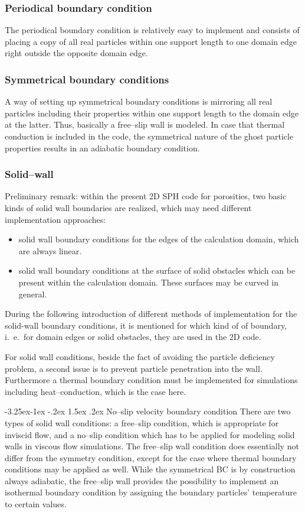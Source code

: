 \documentclass{report}
\makeatletter
\renewcommand\paragraph{\@startsection{paragraph}{4}{\z@}%
  {-3.25ex\@plus -1ex \@minus -.2ex}%
  {1.5ex \@plus .2ex}%
  {\normalfont\normalsize\bfseries}}
\makeatother
\begin{document}
\subsubsection{Periodical boundary condition}
The periodical boundary condition is relatively easy to implement and consists of placing a copy of all real particles within one support length to one domain edge right outside the opposite domain edge.


\subsubsection{Symmetrical boundary conditions}
A way of setting up symmetrical boundary conditions is mirroring all real particles including their properties within one support length to the domain edge at the latter. Thus, basically a free--slip wall is modeled. In case that thermal conduction is included in the code, the symmetrical nature of the ghost particle properties results in an adiabatic boundary condition.

\subsubsection{Solid--wall}
\label{sec:boundaryCond_solidWall}
Preliminary remark: within the present 2D SPH code for porosities, two basic kinds of solid wall boundaries are realized, which may need different implementation approaches:
\begin{itemize}
 \item solid wall boundary conditions for the edges of the calculation domain, which are always linear.
\item solid wall boundary conditions at the surface of solid obstacles which can be present within the calculation domain. These surfaces may be curved in general. 
\end{itemize}
During the following introduction of different methods of implementation for the solid-wall boundary conditions, it is mentioned for which kind of of boundary, i.\ e.\ for domain edges or solid obstacles, they are used in the 2D code. 

For solid wall conditions, beside the fact of avoiding the particle deficiency problem, a second issue is to prevent particle penetration into the wall.
Furthermore a thermal boundary condition must be implemented for simulations including heat--conduction, which is the case here.

\paragraph{No--slip velocity boundary condition}
There are two types of solid wall conditions: a free--slip condition, which is appropriate for inviscid flow, and a no--slip condition which has to be applied for modeling solid walls in viscous flow simulations. The free--slip wall condition does essentially not differ from the symmetry condition, except for the case where thermal boundary conditions may be applied as well. While the symmetrical BC is by construction always adiabatic, the free--slip wall provides the possibility to implement an isothermal boundary condition by assigning the boundary particles' temperature to certain values.
\end{document}
